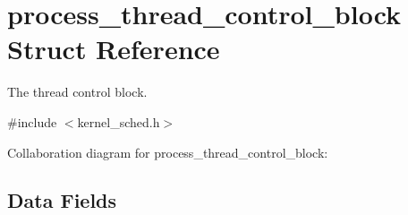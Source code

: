 \hypertarget{structprocess__thread__control__block}{}\section{process\+\_\+thread\+\_\+control\+\_\+block Struct Reference}
\label{structprocess__thread__control__block}


The thread control block.  




{\ttfamily \#include $<$kernel\+\_\+sched.\+h$>$}



Collaboration diagram for process\+\_\+thread\+\_\+control\+\_\+block\+:
\subsection*{Data Fields}
